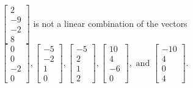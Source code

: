 \begin{exercise}
\begin{exerciseStatement}
  \end{exerciseStatement}
  \begin{exerciseAnswer}
   \(\left[\begin{array}{c}
2 \\
-9 \\
-2 \\
8
\end{array}\right]\) 
  	 is not  
	a linear combination of the vectors \(\left[\begin{array}{c}
0 \\
0 \\
-2 \\
0
\end{array}\right] , \left[\begin{array}{c}
-5 \\
-2 \\
1 \\
0
\end{array}\right] , \left[\begin{array}{c}
-5 \\
2 \\
1 \\
2
\end{array}\right] , \left[\begin{array}{c}
10 \\
4 \\
-6 \\
0
\end{array}\right] , \text{ and } \left[\begin{array}{c}
-10 \\
4 \\
0 \\
4
\end{array}\right]\).

	
  


  \end{exerciseAnswer}
\end{exercise}
